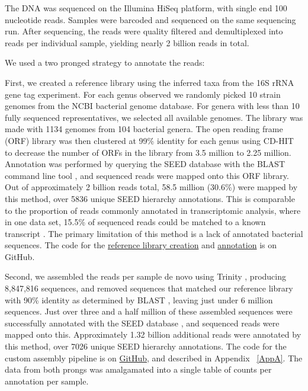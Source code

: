 The DNA was sequenced on the Illumina HiSeq platform, with single end 100 nucleotide reads. Samples were barcoded and sequenced on the same sequencing run. After sequencing, the reads were quality filtered and demultiplexed into reads per individual sample, yielding nearly 2 billion reads in total.

We used a two pronged strategy to annotate the reads:

First, we created a reference library using the inferred taxa from the 16S rRNA gene tag experiment. For each genus observed we randomly picked 10 strain genomes from the NCBI bacterial genome database. For genera with less than 10 fully sequenced representatives, we selected all available genomes. The library was made with 1134 genomes from 104 bacterial genera. The open reading frame (ORF) library was then clustered at 99\% identity for each genus using CD-HIT \cite{li2006cd} to decrease the number of ORFs in the library from 3.5 million to 2.25 million. Annotation was performed by querying the SEED database \cite{overbeek2005subsystems} with the BLAST command line tool \cite{altschul1990basic}, and sequenced reads were mapped onto this ORF library. Out of approximately 2 billion reads total, 58.5 million (30.6\%) were mapped by this method, over 5836 unique SEED hierarchy annotations. This is comparable to the proportion of reads commonly annotated in transcriptomic analysis, where in one data set, 15.5\% of sequenced reads could be matched to a known transcript \cite{celaj2014comparison}. The primary limitation of this method is a lack of annotated bacterial sequences. The code for the \href{https://github.com/ruthgrace/make_functional_mapping_library}{reference library creation} and \href{https://github.com/ruthgrace/mapping_library_annotated_counts}{annotation} is on GitHub.

Second, we assembled the reads per sample de novo using Trinity \cite{haas2013novo}, producing 8,847,816 sequences, and removed sequences that matched our reference library with 90\% identity as determined by BLAST \cite{altschul1990basic}, leaving just under 6 million sequences. Just over three and a half million of these assembled sequences were successfully annotated with the SEED database \cite{overbeek2005subsystems}, and sequenced reads were mapped onto this. Approximately 1.32 billion additional reads were annotated by this method, over 7026 unique SEED hierarchy annotations. The code for the custom assembly pipeline is on \href{https://github.com/ruthgrace/exploring_nafld_assembly}{GitHub}, and described in Appendix ~\ref{AppA}. The data from both prongs was amalgamated into a single table of counts per annotation per sample.

